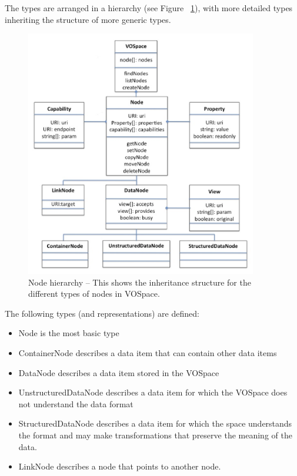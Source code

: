 \documentclass[11pt,a4paper]{ivoa}
\begin{document}
The types are arranged in a hierarchy (see Figure ~\ref{fig:nodehierarchy}), with more detailed types inheriting the structure of more generic types.

\begin{figure}
\centering
\includegraphics[width=0.9\textwidth]{vospace-node-hierarchy.png}
\caption{Node hierarchy -- This shows the inheritance structure for the different types of nodes in VOSpace.}
\label{fig:nodehierarchy}
\end{figure}

The following types (and representations) are defined:

\begin{itemize}
    \item Node is the most basic type
    \item ContainerNode describes a data item that can contain other data items
    \item DataNode describes a data item stored in the VOSpace
    \item UnstructuredDataNode describes a data item for which the VOSpace does not understand the data format
    \item StructuredDataNode describes a data item for which the space understands the format and may make transformations that preserve the meaning of the data.
    \item LinkNode describes a node that points to another node.
\end{itemize}
\end{document}
